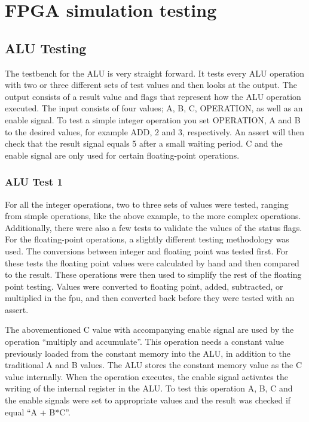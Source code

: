 \section{FPGA simulation testing}\label{section:fpga-simulation-testing}

\subsection{ALU Testing}

The testbench for the ALU is very straight forward. It tests every ALU operation
with two or three different sets of test values and then looks at the output.
The output consists of a result value and flags that represent how the ALU
operation executed. The input consists of four values; A, B, C, OPERATION, as
well as an enable signal. To test a simple integer operation you set OPERATION,
A and B to the desired values, for example ADD, 2 and 3, respectively. An assert
will then check that the result signal equals 5 after a small waiting period. C
and the enable signal are only used for certain floating-point operations.

\subsubsection{ALU Test 1}

For all the integer operations, two to three sets of values were tested, ranging
from simple operations, like the above example, to the more complex operations.
Additionally, there were also a few tests to validate the values of the status flags. For the floating-point
operations, a slightly different testing methodology was used. The conversions
between integer and floating point was tested first. For these tests the
floating point values were calculated by hand and then compared to the result.
These operations were then used to simplify the rest of the floating point
testing. Values were converted to floating point, added, subtracted, or
multiplied in the fpu, and then converted back before they were tested with an
assert.

The abovementioned C value with accompanying enable signal are used by the
operation ``multiply and accumulate''. This operation needs a constant value
previously loaded from the constant memory into the ALU, in addition to the
traditional A and B values. The ALU stores the constant memory value as the C
value internally. When the operation executes, the enable signal activates the
writing of the internal register in the ALU. To test this operation A, B, C and
the enable signals were set to appropriate values and the result was checked if
equal ``A + B*C''.

